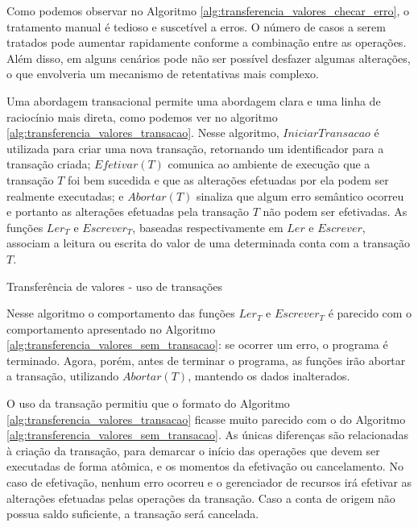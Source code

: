 \documentclass[11pt,twoside,a4paper]{book}
\begin{document}
Como podemos observar no Algoritmo \ref{alg:transferencia_valores_checar_erro}, o tratamento manual é tedioso e suscetível a erros. O número de casos a serem tratados pode aumentar rapidamente conforme a combinação entre as operações. Além disso, em alguns cenários pode não ser possível desfazer algumas alterações, o que envolveria um mecanismo de retentativas mais complexo.

Uma abordagem transacional permite uma abordagem clara e uma linha de raciocínio mais direta, como podemos ver no algoritmo \ref{alg:transferencia_valores_transacao}. Nesse algoritmo, $IniciarTransacao$ é utilizada para criar uma nova transação, retornando um identificador para a transação criada; $Efetivar(T)$ comunica ao ambiente de execução que a transação $T$ foi bem sucedida e que as alterações efetuadas por ela podem ser realmente executadas; e $Abortar(T)$ sinaliza que algum erro semântico ocorreu e portanto as alterações efetuadas pela transação $T$ não podem ser efetivadas. As funções $Ler_T$ e $Escrever_T$, baseadas respectivamente em $Ler$ e $Escrever$, associam a leitura ou escrita do valor de uma determinada conta com a transação $T$.

\begin{algorithm}
\caption{Transferência de valores - uso de transações}
\label{alg:transferencia_valores_transacao}
\end{algorithm}

Nesse algoritmo o comportamento das funções $Ler_T$ e $Escrever_T$ é parecido com o comportamento apresentado no Algoritmo \ref{alg:transferencia_valores_sem_transacao}: se ocorrer um erro, o programa é terminado. Agora, porém, antes de terminar o programa, as funções irão abortar a transação, utilizando $Abortar(T)$, mantendo os dados inalterados.

O uso da transação permitiu que o formato do Algoritmo \ref{alg:transferencia_valores_transacao} ficasse muito parecido com o do Algoritmo \ref{alg:transferencia_valores_sem_transacao}. As únicas diferenças são relacionadas à criação da transação, para demarcar o início das operações que devem ser executadas de forma atômica, e os momentos da efetivação ou cancelamento. No caso de efetivação, nenhum erro ocorreu e o gerenciador de recursos irá efetivar as alterações efetuadas pelas operações da transação. Caso a conta de origem não possua saldo suficiente, a transação será cancelada.
\end{document}
